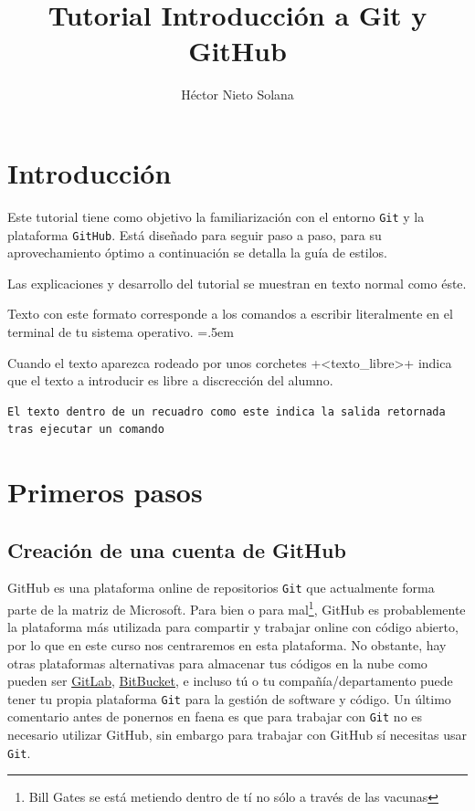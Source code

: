 \documentclass[a5paper,10pt]{article}
\title{Tutorial Introducción a Git y GitHub}
\author{Héctor Nieto Solana}
\newenvironment{cverbatim}
 {\SaveVerbatim{cverb}}
 {\endSaveVerbatim
  \flushleft\fboxrule=0pt\fboxsep=.5em
  \colorbox{bg}{\BUseVerbatim{cverb}}%
  \endflushleft
}
\begin{document}
 \maketitle
 \tableofcontents

 \clearpage
 
 \section*{Introducción}
 
  Este tutorial tiene como objetivo la familiarización con el entorno \verb+Git+ y la plataforma \verb+GitHub+. Está diseñado para seguir paso a paso, para su aprovechamiento óptimo a continuación se detalla la guía de estilos.
 
  Las explicaciones y desarrollo del tutorial se muestran en texto normal como éste.
 
  \begin{cverbatim}
Texto con este formato corresponde a los comandos a escribir
literalmente en el terminal de tu sistema operativo. 
  \end{cverbatim}

  Cuando el texto aparezca rodeado por unos corchetes \cverb+<texto_libre>+ indica que el texto a introducir es libre a discrección del alumno.
  
  \begin{lstlisting}[style=custom, caption=Ejemplo de salida retornada por un comando]
El texto dentro de un recuadro como este indica la salida retornada tras ejecutar un comando
  \end{lstlisting} 

 \clearpage

 \section{Primeros pasos}

  \subsection{Creación de una cuenta de GitHub}\label{sec:github_login}
    GitHub es una plataforma online de repositorios \verb+Git+ que actualmente forma parte de la matriz de Microsoft. Para bien o para mal\footnote{Bill Gates se está metiendo dentro de tí no sólo a través de las vacunas}, GitHub es probablemente la plataforma más utilizada para compartir y trabajar online con código abierto, por lo que en este curso nos centraremos en esta plataforma. No obstante, hay otras plataformas alternativas para almacenar tus códigos en la nube como pueden ser \href{https://about.gitlab.com}{GitLab}, \href{https://bitbucket.org}{BitBucket}, e incluso tú o tu compañía/departamento puede tener tu propia plataforma \verb+Git+ para la gestión de software y código. Un último comentario antes de ponernos en faena es que para trabajar con \verb+Git+ no es necesario utilizar GitHub, sin embargo para trabajar con GitHub sí necesitas usar \verb+Git+. 
    
\end{document}
